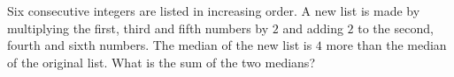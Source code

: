 Six consecutive integers are listed in increasing order. A new list is made by multiplying the first, third and fifth numbers by $2$ and adding $2$ to the second, fourth and sixth numbers. The median of the new list is $4$ more than the median of the original list. What is the sum of the two medians?
